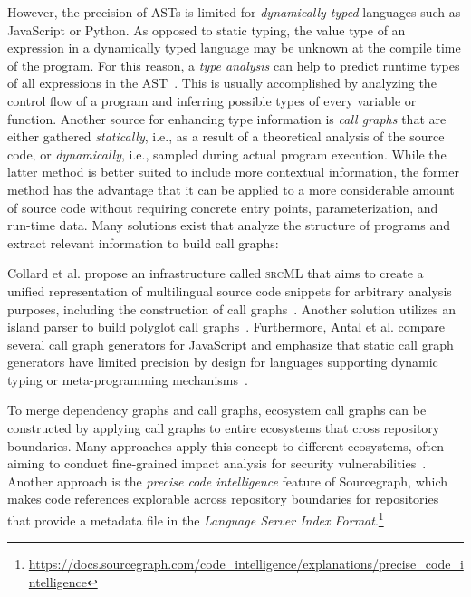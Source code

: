 \documentclass[a4paper,twoside]{article}
\newcommand\caps[1]{%
	\textsc{#1}%
}
\begin{document}
However, the precision of ASTs is limited for \emph{dynamically typed} languages such as JavaScript or Python.
As opposed to static typing, the value type of an expression in a dynamically typed language may be unknown at the compile time of the program.
For this reason, a \emph{type analysis} can help to predict runtime types of all expressions in the AST~\cite{jensen2009type}.
This is usually accomplished by analyzing the control flow of a program and inferring possible types of every variable or function.
Another source for enhancing type information is \emph{call graphs} that are either gathered \emph{statically}, i.e., as a result of a theoretical analysis of the source code, or \emph{dynamically}, i.e., sampled during actual program execution.
While the latter method is better suited to include more contextual information, the former method has the advantage that it can be applied to a more considerable amount of source code without requiring concrete entry points, parameterization, and run-time data.
Many solutions exist that analyze the structure of programs and extract relevant information to build call graphs:

Collard et al. propose an infrastructure called \caps{srcML} that aims to create a unified representation of multilingual source code snippets for arbitrary analysis purposes, including the construction of call graphs~\cite{collard2013srcml}.
Another solution utilizes an island parser to build polyglot call graphs~\cite{bogar2018lightweight}.
Furthermore, Antal et al. compare several call graph generators for JavaScript and emphasize that static call graph generators have limited precision by design for languages supporting dynamic typing or meta-programming mechanisms~\cite{antal2018static}.

To merge dependency graphs and call graphs, ecosystem call graphs can be constructed by applying call graphs to entire ecosystems that cross repository boundaries.
Many approaches apply this concept to different ecosystems, often aiming to conduct fine-grained impact analysis for security vulnerabilities~\cite{hejderup2018software,boldi2020fine,wang2020empirical,hejderup2021praezi,keshani2021scalable,nielsen2021modular}.
Another approach is the \emph{precise code intelligence} feature of Sourcegraph, which makes code references explorable across repository boundaries for repositories that provide a metadata file in the \emph{Language Server Index Format}.\footnote{\url{https://docs.sourcegraph.com/code_intelligence/explanations/precise_code_intelligence}}
\end{document}
